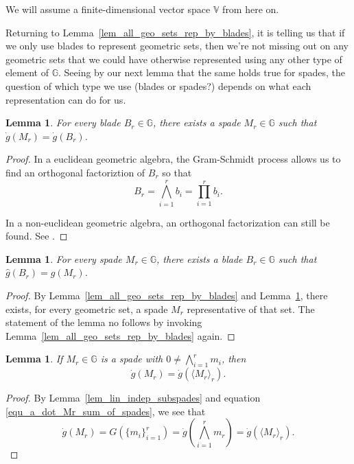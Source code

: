 \documentclass{birkjour}
\newtheorem{lem}[thm]{Lemma}
\theoremstyle{definition}
\theoremstyle{remark}
\numberwithin{equation}{section}
\newcommand{\G}{\mathbb{G}}
\newcommand{\V}{\mathbb{V}}
\newcommand{\gd}{\dot{g}}
\newcommand{\gh}{\hat{g}}
\begin{document}
We will assume a finite-dimensional vector space $\V$ from here on.

Returning to Lemma~\ref{lem_all_geo_sets_rep_by_blades}, it is telling us that if we only use blades to represent geometric sets, then we're not missing out on any geometric sets
that we could have otherwise represented using any other type of element of $\G$.  Seeing by our next
lemma that the same holds true for spades, the question of which type we use (blades or spades?) depends
on what each representation can do for us.

\begin{lem}\label{lem_spade_for_blade}
For every blade $B_r\in\G$, there exists a spade $M_r\in\G$ such that $\gd(M_r)=\gd(B_r)$.
\end{lem}
\begin{proof}
In a euclidean geometric algebra, the Gram-Schmidt process allows us to find an orthogonal factoriztion
of $B_r$ so that
\begin{equation*}
B_r = \bigwedge_{i=1}^r b_i = \prod_{i=1}^r b_i.
\end{equation*}

In a non-euclidean geometric algebra, an orthogonal factorization can still be found.
See \cite[p. 88]{Doran03}.
\end{proof}

\begin{lem}\label{lem_blade_for_spade}
For every spade $M_r\in\G$, there exists a blade $B_r\in\G$ such that $\gh(B_r)=\gh(M_r)$.
\end{lem}
\begin{proof}
By Lemma~\ref{lem_all_geo_sets_rep_by_blades} and Lemma~\ref{lem_spade_for_blade}, there exists, for every geometric set, a spade $M_r$
representative of that set.  The statement of the lemma no follows by invoking Lemma~\ref{lem_all_geo_sets_rep_by_blades} again.
\end{proof}

\begin{lem}\label{lem_blade_for_spade_almost}
If $M_r\in\G$ is a spade with $0\neq\bigwedge_{i=1}^r m_i$, then
\begin{equation*}
\gd(M_r) = \gd(\langle M_r\rangle_r).
\end{equation*}
\end{lem}
\begin{proof}
By Lemma~\ref{lem_lin_indep_subspades} and equation \eqref{equ_a_dot_Mr_sum_of_spades}, we see that
\begin{equation*}
\gd(M_r) = G(\{m_i\}_{i=1}^r) = \gd\left(\bigwedge_{i=1}^r m_r\right) = \gd(\langle M_r\rangle_r).
\end{equation*}
\end{proof}
\end{document}
